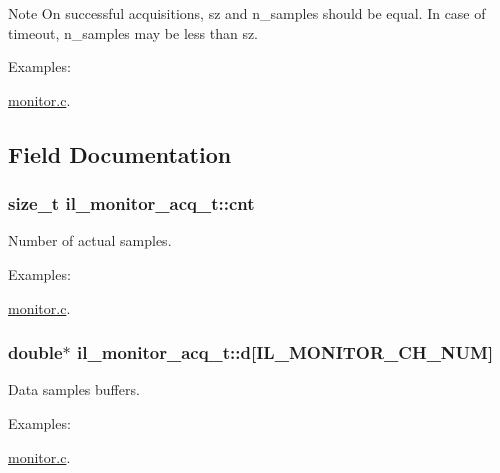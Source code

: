 \begin{DoxyNote}{Note}
On successful acquisitions, sz and n\+\_\+samples should be equal. In case of timeout, n\+\_\+samples may be less than sz. 
\end{DoxyNote}
\begin{Desc}
\item[Examples\+: ]\par
\hyperlink{monitor_8c-example}{monitor.\+c}.\end{Desc}


\subsection{Field Documentation}
\subsubsection[{\texorpdfstring{cnt}{cnt}}]{\setlength{\rightskip}{0pt plus 5cm}size\+\_\+t il\+\_\+monitor\+\_\+acq\+\_\+t\+::cnt}\hypertarget{structil__monitor__acq__t_a82be21ff5f08413736841b02666823ad}{}\label{structil__monitor__acq__t_a82be21ff5f08413736841b02666823ad}


Number of actual samples. 

\begin{Desc}
\item[Examples\+: ]\par
\hyperlink{monitor_8c-example}{monitor.\+c}.\end{Desc}
\subsubsection[{\texorpdfstring{d}{d}}]{\setlength{\rightskip}{0pt plus 5cm}double$\ast$ il\+\_\+monitor\+\_\+acq\+\_\+t\+::d\mbox{[}{\bf I\+L\+\_\+\+M\+O\+N\+I\+T\+O\+R\+\_\+\+C\+H\+\_\+\+N\+UM}\mbox{]}}\hypertarget{structil__monitor__acq__t_adbc831472b0744d1a14b52f34388314f}{}\label{structil__monitor__acq__t_adbc831472b0744d1a14b52f34388314f}


Data samples buffers. 

\begin{Desc}
\item[Examples\+: ]\par
\hyperlink{monitor_8c-example}{monitor.\+c}.\end{Desc}
